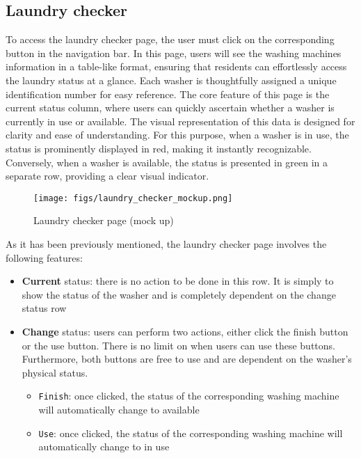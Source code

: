 \documentclass[conference]{IEEEtran}
\begin{document}
\subsection{Laundry checker}
To access the laundry checker page, the user must click on the corresponding button in the navigation bar. In this page, users will see the washing machines information in a table-like format, ensuring that residents can effortlessly access the laundry status at a glance. Each washer is thoughtfully assigned a unique identification number for easy reference. The core feature of this page is the current status column, where users can quickly ascertain whether a washer is currently in use or available. The visual representation of this data is designed for clarity and ease of understanding. For this purpose, when a washer is in use, the status is prominently displayed in red, making it instantly recognizable. Conversely, when a washer is available, the status is presented in green in a separate row, providing a clear visual indicator.
\begin{figure}[H]
\centering
\texttt{[image: figs/laundry\_checker\_mockup.png]}
\caption{Laundry checker page (mock up)}
\label{fig:Laundry checker page mokup}
\end{figure}
As it has been previously mentioned, the laundry checker page involves the following features:
\begin{itemize}
    \item \textbf{Current} status: there is no action to be done in this row. It is simply to show the status of the washer and is completely dependent on the change status row
    \item \textbf{Change} status: users can perform two actions, either click the finish button or the use button. There is no limit on when users can use these buttons. Furthermore, both buttons are free to use and are dependent on the washer's physical status.
    \begin{itemize}
        \item \texttt{Finish}: once clicked, the status of the corresponding washing machine will automatically change to available
        \item \texttt{Use}: once clicked, the status of the corresponding washing machine will automatically change to in use
    \end{itemize}
\end{itemize}
\end{document}
